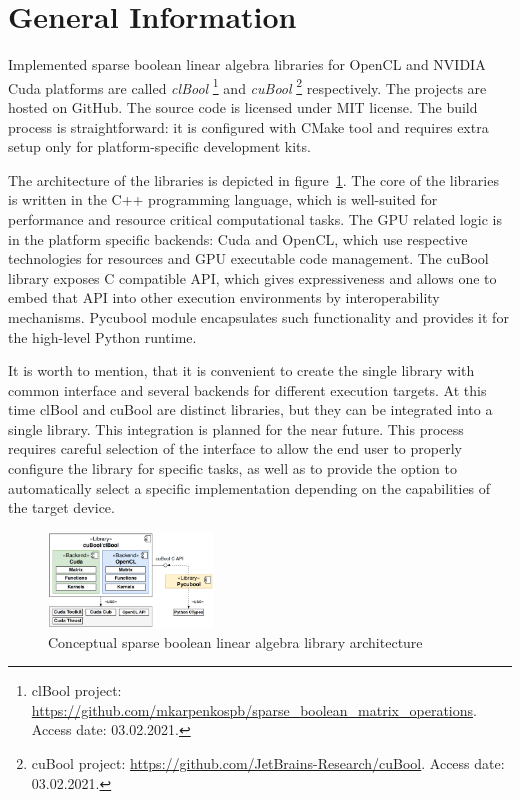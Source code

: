 \section{General Information}



Implemented sparse boolean linear algebra libraries for OpenCL and NVIDIA Cuda platforms are called
\textit{clBool}
\footnote{clBool project: \url{https://github.com/mkarpenkospb/sparse_boolean_matrix_operations}. Access date: 03.02.2021.} and 
\textit{cuBool}
\footnote{cuBool project: \url{https://github.com/JetBrains-Research/cuBool}. Access date: 03.02.2021.} respectively.
The projects are hosted on GitHub.
The source code is licensed under MIT license.
The build process is straightforward: it is configured with CMake tool and requires extra setup only for platform-specific development kits.

The architecture of the libraries is depicted in figure~\ref{fig:generic_architecture}.
The core of the libraries is written in the C++ programming language, which is well-suited for performance and resource critical computational tasks.
The GPU related logic is in the platform specific backends: Cuda and OpenCL, which use respective technologies for resources and GPU executable code management.
The cuBool library exposes C compatible API, which gives expressiveness and allows one to embed that API into other execution environments by interoperability mechanisms.
Pycubool module encapsulates such functionality and provides it for the high-level Python runtime.

It is worth to mention, that it is convenient to create the single library with common interface and several backends for different execution targets.
At this time clBool and cuBool are distinct libraries, but they can be integrated into a single library.
This integration is planned for the near future.
This process requires careful selection of the interface to allow the end user to properly configure the library for specific tasks, as well as to provide the option to automatically select a specific implementation depending on the capabilities of the target device.

\begin{figure}[t]
    \centering
    \includegraphics[width=0.39\textwidth]{generic_architecture.png}
    \caption{Conceptual sparse boolean linear algebra library architecture}
    \label{fig:generic_architecture}
\end{figure}

